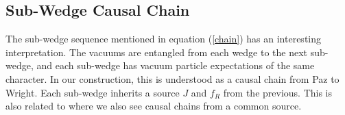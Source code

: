 \documentclass[12pt,a4paper]{article}
\begin{document}
{%
% 
% 
% 
%

\subsection{Sub-Wedge Causal Chain} \label{sec:chain_sources}

The sub-wedge sequence mentioned in equation (\ref{chain}) has an interesting interpretation.  The vacuums are entangled from each wedge to the next sub-wedge, and each sub-wedge has vacuum particle expectations of the same character. In our construction, this is understood as a causal chain from Paz to Wright.  Each sub-wedge inherits a source $J$ and $f_R$ from the previous. This is also related to \cite{Svidzinsky2024MinkowskiVEA} where we also see causal chains from a common source.

}
\end{document}
